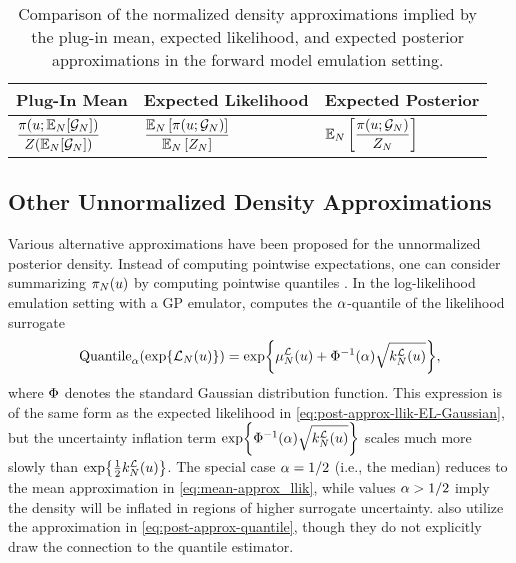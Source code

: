 \documentclass[12pt]{article}
\begin{document}
\begin{table}[h]
\centering
\begin{tabular}{>{\centering\arraybackslash}p{4cm} >{\centering\arraybackslash}p{5cm} >{\centering\arraybackslash}p{5cm}}
\toprule
\textbf{Plug-In Mean} & \textbf{Expected Likelihood} & \textbf{Expected Posterior} \\
\midrule
$\displaystyle \frac{\postDens(\Par; \E_{\Ndesign}[\fwdEm[\Ndesign]])}{\normCst(\E_{\Ndesign}[\fwdEm[\Ndesign]])}$ & 
$\displaystyle \frac{\E_{\Ndesign}\left[\postDens(\Par; \fwdEm[\Ndesign])\right]}{\E_{\Ndesign}\left[\normCstEm[\Ndesign]\right]}$ & 
$\displaystyle \E_{\Ndesign}\left[\frac{\postDens(\Par; \fwdEm[\Ndesign])}{\normCstEm[\Ndesign]}\right]$ \\
\bottomrule
\end{tabular}
\caption{Comparison of the normalized density approximations implied by the plug-in mean, expected likelihood,
and expected posterior approximations in the forward model emulation setting.}
\label{tab:post-approx-comparison}
\end{table}

\subsection{Other Unnormalized Density Approximations}
Various alternative approximations have been proposed for the unnormalized posterior density. 
Instead of computing pointwise expectations, one can consider summarizing $\postEm[\Ndesign](\Par)$
by computing pointwise quantiles \citep{VehtariParallelGP,quantileApprox}. In the log-likelihood 
emulation setting with a GP emulator, \cite{VehtariParallelGP} computes the $\quantileProb$-quantile of 
the likelihood surrogate
\begin{equation}
\mathrm{Quantile}_{\quantileProb}(\Exp{\llikEm[\Ndesign](\Par)})
= \Exp{\emMean[\Ndesign]{\llik}(\Par) + \GaussianCDF^{-1}(\quantileProb) \sqrt{\emKer[\Ndesign]{\llik}(\Par)}},
\label{eq:post-approx-quantile}
\end{equation}
where $\GaussianCDF$ denotes the standard Gaussian distribution function. This expression is of the same form 
as the expected likelihood in \cref{eq:post-approx-llik-EL-Gaussian}, but the uncertainty inflation term 
$\Exp{\GaussianCDF^{-1}(\quantileProb) \sqrt{\emKer[\Ndesign]{\llik}(\Par)}}$ scales much more slowly than 
$\Exp{\frac{1}{2} \emKer[\Ndesign]{\llik}(\Par)}$. The special case $\quantileProb = 1/2$ (i.e., the median) 
reduces to the mean approximation in \cref{eq:mean-approx_llik}, while values $\quantileProb > 1/2$ imply 
the density will be inflated in regions of higher surrogate uncertainty. \citet{FATES_CES} also utilize the 
approximation in \cref{eq:post-approx-quantile}, though they do not explicitly draw the connection to 
the quantile estimator.
\end{document}
